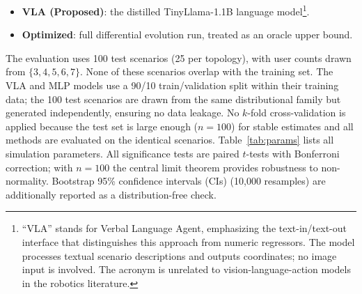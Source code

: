 \documentclass[journal]{IEEEtran}
\begin{document}
\begin{itemize}
    \item \textbf{VLA (Proposed)}: the distilled TinyLlama-1.1B language model\footnote{``VLA'' stands for Verbal Language Agent, emphasizing the text-in/text-out interface that distinguishes this approach from numeric regressors. The model processes textual scenario descriptions and outputs coordinates; no image input is involved. The acronym is unrelated to vision-language-action models in the robotics literature.}.
    \item \textbf{Optimized}: full differential evolution run, treated as an oracle upper bound.
\end{itemize}

The evaluation uses 100 test scenarios (25 per topology), with user counts drawn from $\{3,4,5,6,7\}$. None of these scenarios overlap with the training set. The VLA and MLP models use a 90/10 train/validation split within their training data; the 100 test scenarios are drawn from the same distributional family but generated independently, ensuring no data leakage. No $k$-fold cross-validation is applied because the test set is large enough ($n{=}100$) for stable estimates and all methods are evaluated on the identical scenarios. Table~\ref{tab:params} lists all simulation parameters. All significance tests are paired $t$-tests with Bonferroni correction; with $n{=}100$ the central limit theorem provides robustness to non-normality. Bootstrap 95\% confidence intervals (CIs) (10{,}000 resamples) are additionally reported as a distribution-free check.
\end{document}

